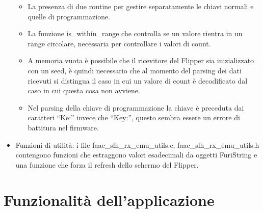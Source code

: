 \begin{itemize}
\begin{itemize}
    \item La presenza di due routine per gestire separatamente le chiavi normali e quelle di programmazione.
    \item La funzione is\_within\_range che controlla se un valore rientra in un range circolare, necessaria per controllare i valori di count.
    \item A memoria vuota è possibile che il ricevitore del Flipper sia inizializzato con un seed, è quindi necessario che al momento del parsing dei dati ricevuti si distingua il caso in cui un valore di count è decodificato dal caso in cui questa cosa non avviene.
    \item Nel parsing della chiave di programmazione la chiave è preceduta dai caratteri “Ke:” invece che “Key:”, questo sembra essere un errore di battitura nel firmware.
  \end{itemize}
  \item Funzioni di utilità: i file faac\_slh\_rx\_emu\_utils.c, faac\_slh\_rx\_emu\_utils.h contengono funzioni che estraggono valori esadecimali da oggetti FuriString e una funzione che forza il refresh dello schermo del Flipper.
\end{itemize}

\section{Funzionalità dell'applicazione}
\label{sec:func}

